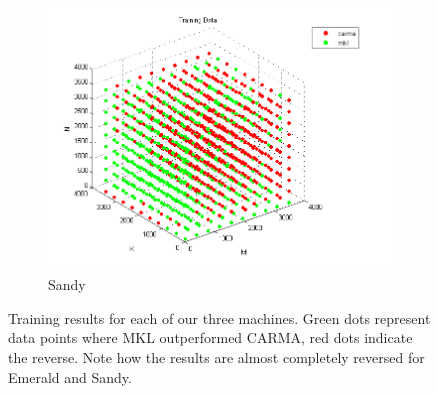 \begin{figure}
\begin{subfigure}[b]{0.3\textwidth}
            \includegraphics[width=\textwidth]{figures/sandy_train.png}
            \caption{Sandy}
            \label{f:train_sandy}
        \end{subfigure}
        \caption{Training results for each of our three machines. Green dots represent data points where MKL outperformed CARMA, red dots indicate the reverse. Note how the results are almost completely reversed for Emerald and Sandy.}
    \label{fig:training}
\end{figure}


